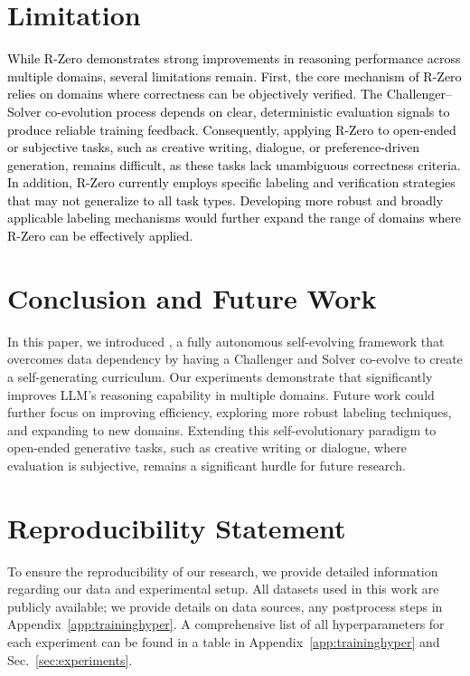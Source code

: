 \section{Limitation}
\textcolor{black}{While R-Zero demonstrates strong improvements in reasoning performance across multiple domains, several limitations remain. First, the core mechanism of R-Zero relies on domains where correctness can be objectively verified. The Challenger–Solver co-evolution process depends on clear, deterministic evaluation signals to produce reliable training feedback. Consequently, applying R-Zero to open-ended or subjective tasks, such as creative writing, dialogue, or preference-driven generation, remains difficult, as these tasks lack unambiguous correctness criteria. In addition, R-Zero currently employs specific labeling and verification strategies that may not generalize to all task types. Developing more robust and broadly applicable labeling mechanisms would further expand the range of domains where R-Zero can be effectively applied.}

\section{Conclusion and Future Work}
\label{sec:conclusion}
In this paper, we introduced \method{}, a fully autonomous self-evolving framework that overcomes data dependency by having a Challenger and Solver co-evolve to create a self-generating curriculum.
Our experiments demonstrate that \method{} significantly improves LLM's reasoning capability in multiple domains. Future work could further focus on improving efficiency, exploring more robust labeling techniques, and expanding \method{} to new domains.
Extending this self-evolutionary paradigm to open-ended generative tasks, such as creative writing or dialogue, where evaluation is subjective, remains a significant hurdle for future research. 

\section*{Reproducibility Statement}
To ensure the reproducibility of our research, we provide detailed information regarding our data and experimental setup. All datasets used in this work are publicly available; we provide details on data sources, any postprocess steps in Appendix~\ref{app:traininghyper}. A comprehensive list of all hyperparameters for each experiment can be found in a table in Appendix~\ref{app:traininghyper} and Sec.~\ref{sec:experiments}. 